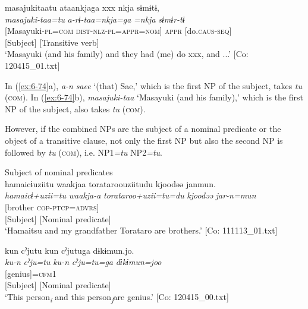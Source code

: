 {\TM}
\gllll masajukitaatu  ataankjaga  xxx  nkja  sɨmɨtɨ,\\
      \textit{masajuki-taa=tu}  \textit{a-rɨ-taa=nkja=ga}    \textit{=nkja}     \textit{sɨmɨr-tɨ}\\
      {}[Masayuki-\textsc{pl}=\textsc{com}  \textsc{dist}-\textsc{nlz}-\textsc{pl}=\textsc{appr}=\textsc{nom}]    \textsc{appr}      [do.\textsc{caus}-\textsc{seq}]\\
      {}[Subject]          [Transitive verb]\\
\glt ‘Masayuki (and his family) and they had (me) do xxx, and ...’ [Co: 120415\_01.txt]
\z
\z

In (\ref{ex:6-74}a), \textit{a-n} \textit{saee} ‘(that) Sae,’ which is the first NP of the subject, takes \textit{tu} (\textsc{com}). In (\ref{ex:6-74}b), \textit{masajuki-taa} ‘Masayuki (and his family),’ which is the first NP of the subject, also takes \textit{tu} (\textsc{com}).

  However, if the combined NPs are the subject of a nominal predicate or the object of a transitive clause, not only the first NP but also the second NP is followed by \textit{tu} (\textsc{com}), i.e. NP1\textit{=tu} NP2\textit{=tu}.

\ea\label{ex:6-75}
 Subject of nominal predicates\\

 \ea
 {\TM}
\gllll hamaicɨuziitu  waakjaa  torataroouziitudu     kjoodəə  janmun.\\
\textit{hamaicɨ+uzii=tu}  \textit{waakja-a}  \textit{torataroo+uzii=tu=du}    \textit{kjoodəə}  \textit{jar-n=mun}\\
[Hamaitsu+grandfather=\textsc{com}  1\textsc{pl}-\textsc{adnz}  Torataro+grandfather=\textsc{com}=\textsc{foc}]     [brother  \textsc{cop}-\textsc{ptcp}=\textsc{advrs}]\\
      {}[Subject]      [Nominal predicate]\\
\glt ‘Hamaitsu and my grandfather Torataro are brothers.’ [Co: 111113\_01.txt]

\ex
{\TM}
\gllll kun  cˀjutu  kun  cˀjutuga      dɨkɨmun.jo.\\
\textit{ku-n}  \textit{cˀju=tu}  \textit{ku-n}  \textit{cˀju=tu=ga}    \textit{dɨkɨmun=joo}\\
[\textsc{prox}-\textsc{adnz}  person=\textsc{com}  \textsc{prox}-\textsc{adnz}  person=\textsc{com}]     [genius]=\textsc{cfm}1\\
      {}[Subject]      [Nominal predicate]\\
\glt ‘This person\textit{\textsubscript{i}} and this person\textit{\textsubscript{j}}are genius.’ [Co: 120415\_00.txt]

